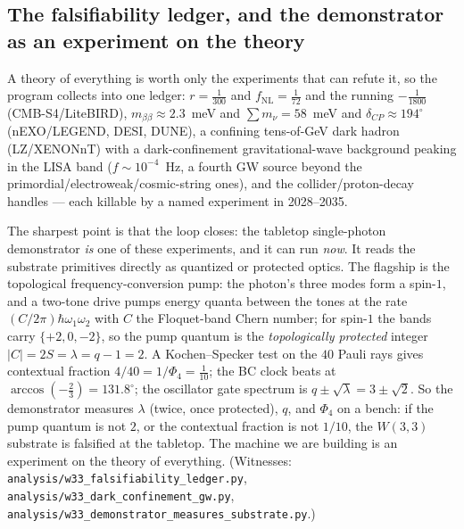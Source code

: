 \documentclass[11pt]{article}
\begin{document}
\subsection{The falsifiability ledger, and the demonstrator as an experiment on the
theory}
\label{sec:falsifiability}

A theory of everything is worth only the experiments that can refute it, so the
program collects into one ledger: $r=\tfrac1{300}$ and $f_{\mathrm{NL}}=\tfrac1{72}$
and the running $-\tfrac1{1800}$ (CMB-S4/LiteBIRD), $m_{\beta\beta}\approx2.3$~meV
and $\sum m_\nu=58$~meV and $\delta_{CP}\approx194^\circ$ (nEXO/LEGEND, DESI, DUNE),
a confining tens-of-GeV dark hadron (LZ/XENONnT) with a dark-confinement
gravitational-wave background peaking in the LISA band ($f\sim10^{-4}$~Hz, a fourth
GW source beyond the primordial/electroweak/cosmic-string ones), and the
collider/proton-decay handles --- each killable by a named experiment in
2028--2035.

The sharpest point is that the loop closes: the tabletop single-photon demonstrator
\emph{is} one of these experiments, and it can run \emph{now}. It reads the
substrate primitives directly as quantized or protected optics. The flagship is the
topological frequency-conversion pump: the photon's three modes form a spin-$1$,
and a two-tone drive pumps energy quanta between the tones at the rate
$(C/2\pi)\hbar\omega_1\omega_2$ with $C$ the Floquet-band Chern number; for spin-$1$
the bands carry $\{+2,0,-2\}$, so the pump quantum is the \emph{topologically
protected} integer $|C|=2S=\lambda=q-1=2$. A Kochen--Specker test on the $40$ Pauli
rays gives contextual fraction $4/40=1/\Phi_4=\tfrac1{10}$; the BC clock beats at
$\arccos(-\tfrac23)=131.8^\circ$; the oscillator gate spectrum is $q\pm\sqrt\lambda
=3\pm\sqrt2$. So the demonstrator measures $\lambda$ (twice, once protected), $q$,
and $\Phi_4$ on a bench: if the pump quantum is not $2$, or the contextual fraction
is not $1/10$, the $W(3,3)$ substrate is falsified at the tabletop. The machine we
are building is an experiment on the theory of everything. (Witnesses:
\texttt{analysis/w33\_falsifiability\_ledger.py},
\texttt{analysis/w33\_dark\_confinement\_gw.py},
\texttt{analysis/w33\_demonstrator\_measures\_substrate.py}.)
\end{document}
